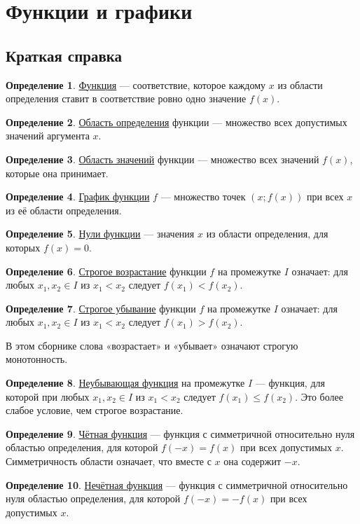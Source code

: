 \documentclass[12pt,a4paper]{article}
\theoremstyle{definition}
\newtheorem{definition}{Определение}[section]
\theoremstyle{plain}
\theoremstyle{remark}
\newcommand{\term}[1]{\uline{#1}}
\begin{document}
\section{Функции и графики}
\subsection*{Краткая справка}
\begin{definition}\term{Функция} — соответствие, которое каждому \(x\) из области определения ставит в соответствие ровно одно значение \(f (x)\).\end{definition}
\begin{definition}\term{Область определения} функции — множество всех допустимых значений аргумента \(x\).\end{definition}
\begin{definition}\term{Область значений} функции — множество всех значений \(f(x)\), которые она принимает.\end{definition}
\begin{definition}\term{График функции} \(f\) — множество точек \((x;f(x))\) при всех \(x\) из её области определения.\end{definition}
\begin{definition}\term{Нули функции} — значения \(x\) из области определения, для которых \(f(x)=0\).\end{definition}
\begin{definition}\term{Строгое возрастание} функции \(f\) на промежутке \(I\) означает: для любых \(x_1,x_2\in I\) из \(x_1<x_2\) следует \(f(x_1)<f(x_2)\).\end{definition}
\begin{definition}\term{Строгое убывание} функции \(f\) на промежутке \(I\) означает: для любых \(x_1,x_2\in I\) из \(x_1<x_2\) следует \(f(x_1)>f(x_2)\).\end{definition}
В этом сборнике слова «возрастает» и «убывает» означают строгую монотонность.
\begin{definition}\term{Неубывающая функция} на промежутке \(I\) — функция, для которой при любых \(x_1,x_2\in I\) из \(x_1<x_2\) следует \(f(x_1)\le f(x_2)\). Это более слабое условие, чем строгое возрастание.\end{definition}
\begin{definition}\term{Чётная функция} — функция с симметричной относительно нуля областью определения, для которой \(f(-x)=f(x)\) при всех допустимых \(x\). Симметричность области означает, что вместе с \(x\) она содержит \(-x\).\end{definition}
\begin{definition}\term{Нечётная функция} — функция с симметричной относительно нуля областью определения, для которой \(f(-x)=-f(x)\) при всех допустимых \(x\).\end{definition}
\end{document}
